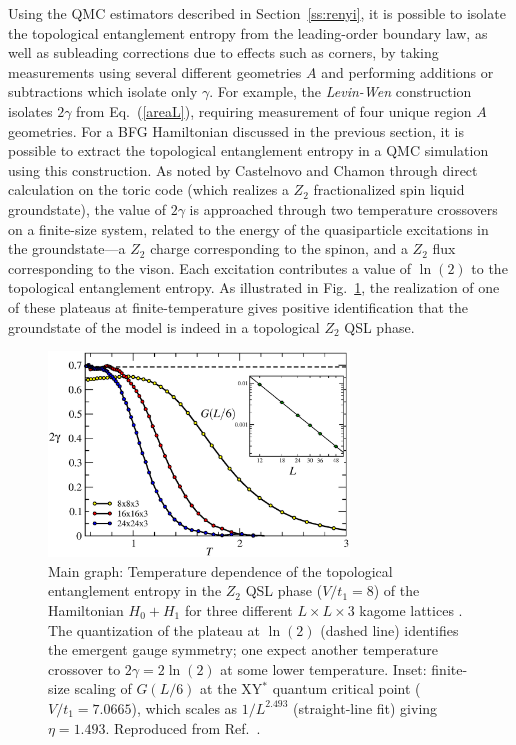 \documentclass[10pt,pre,aps,twocolumn,showpacs,superscriptaddress,floatfix]{revtex4-1}
\begin{document}
Using the QMC estimators described in Section~\ref{ss:renyi}, it is possible to isolate the topological entanglement entropy from the leading-order boundary law, as well as subleading corrections due to effects such as corners, by taking measurements using several different geometries $A$ and performing additions or subtractions which isolate only $\gamma$.  For example, the {\it Levin-Wen} \cite{LW} construction isolates $2\gamma$ from Eq.~(\ref{areaL}), requiring measurement of four unique region $A$ geometries.  For a BFG Hamiltonian discussed in the 
previous section, it is possible to extract the topological entanglement entropy in a QMC simulation using this construction.  As noted by Castelnovo and Chamon \cite{castelnovo} through direct calculation on the toric code (which realizes a $Z_2$ fractionalized spin liquid groundstate), the value of $2\gamma$ is approached through two temperature crossovers on a finite-size system, related to the energy of the quasiparticle excitations in the groundstate---a $Z_2$ charge corresponding to the spinon, and a $Z_2$ flux corresponding to the vison.  Each excitation contributes a value of $\ln(2)$ to the topological entanglement entropy.  As illustrated in Fig.~\ref{QSLfig}, the realization of one of these plateaus at finite-temperature gives positive identification that the groundstate of the model is indeed in a topological $Z_2$ QSL phase.

\begin{figure}
\includegraphics[width=8cm, clip]{fig10.eps}
\caption{Main graph: Temperature dependence of the topological entanglement entropy in the $Z_2$ QSL phase ($V/t_1 = 8$) of the Hamiltonian $H_0 + H_1$ 
for three different $L \times L \times 3$ kagome lattices \cite{TopoEE}.  The quantization of the plateau at $\ln(2)$ (dashed line) identifies the emergent 
gauge symmetry; one expect another temperature crossover to $2 \gamma = 2 \ln(2)$ at some lower temperature. Inset: finite-size scaling of $G(L/6)$ at the 
XY$^*$ quantum critical point ($V/t_1 = 7.0665$), which scales as  $1/L^{2.493}$ (straight-line fit) giving $\eta = 1.493$. Reproduced from Ref.~\cite{XYstarQMC}.}
\label{QSLfig}
\end{figure}
\end{document}
